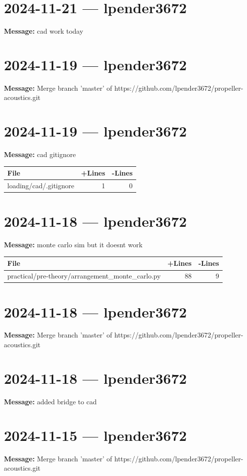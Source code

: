 \documentclass{article}
\begin{document}
\section*{2024-11-21 --- lpender3672}
\textbf{Message:} cad work today

\section*{2024-11-19 --- lpender3672}
\textbf{Message:} Merge branch 'master' of https://github.com/lpender3672/propeller-acoustics.git

\section*{2024-11-19 --- lpender3672}
\textbf{Message:} cad gitignore

\begin{longtable}{|p{10cm}|r|r|}
\hline \textbf{File} & \textbf{+Lines} & \textbf{-Lines} \\
\hline
loading/cad/.gitignore & 1 & 0 \\
\hline
\end{longtable}

\section*{2024-11-18 --- lpender3672}
\textbf{Message:} monte carlo sim but it doesnt work

\begin{longtable}{|p{10cm}|r|r|}
\hline \textbf{File} & \textbf{+Lines} & \textbf{-Lines} \\
\hline
practical/pre-theory/arrangement\_monte\_carlo.py & 88 & 9 \\
\hline
\end{longtable}

\section*{2024-11-18 --- lpender3672}
\textbf{Message:} Merge branch 'master' of https://github.com/lpender3672/propeller-acoustics.git

\section*{2024-11-18 --- lpender3672}
\textbf{Message:} added bridge to cad

\section*{2024-11-15 --- lpender3672}
\textbf{Message:} Merge branch 'master' of https://github.com/lpender3672/propeller-acoustics.git
\end{document}

